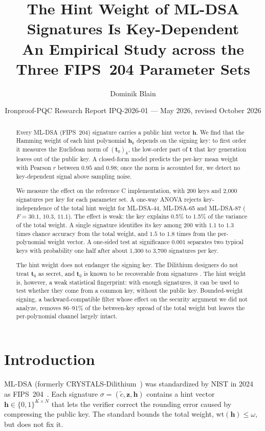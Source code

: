 \documentclass{article}
\title{\textbf{The Hint Weight of ML-DSA Signatures Is Key-Dependent}\\[4pt]
\large An Empirical Study across the Three FIPS~204 Parameter Sets}
\author[1]{Dominik Blain}
\affil[1]{Ironproof \quad \texttt{dominik@ironproof.ai}}
\date{Ironproof-PQC Research Report IPQ-2026-01 \quad --- \quad May 2026, revised October 2026}
\newcommand{\hint}{\mathbf{h}}
\newcommand{\tzero}{\mathbf{t}_0}
\newcommand{\boldz}{\mathbf{z}}
\newcommand{\wt}[1]{\mathrm{wt}(#1)}
\begin{document}
\maketitle

\begin{abstract}
Every ML-DSA (FIPS~204) signature carries a public hint vector $\hint$.
We find that the Hamming weight of each hint polynomial $\hint_k$ depends on
the signing key: to first order it measures the Euclidean norm of
$(\tzero)_k$, the low-order part of $\mathbf{t}$ that key generation leaves out
of the public key.  A closed-form model predicts the per-key mean weight with
Pearson $r$ between $0.95$ and $0.98$; once the norm is accounted for, we
detect no key-dependent signal above sampling noise.

We measure the effect on the reference C implementation, with 200 keys and
2,000 signatures per key for each parameter set.  A one-way ANOVA rejects
key-independence of the total hint weight for ML-DSA-44, ML-DSA-65 and
ML-DSA-87 ($F = 30.1$, $10.3$, $11.1$).  The effect is weak: the key explains
0.5\% to 1.5\% of the variance of the total weight.  A single signature
identifies its key among 200 with $1.1$ to $1.3$ times chance accuracy from
the total weight, and $1.5$ to $1.8$ times from the per-polynomial weight
vector.  A one-sided test at significance $0.001$ separates two typical keys with
probability one half after about 1,300 to 3,700 signatures per key.

The hint weight does not endanger the signing key.  The Dilithium designers do not treat
$\tzero$ as secret, and $\tzero$ is known to be recoverable from signatures
\cite{azevedo2024uncompressing}.  The hint weight is, however, a weak
statistical fingerprint: with enough signatures, it can be used to test whether
they come from a common key, without the public key.  Bounded-weight signing, a backward-compatible filter
whose effect on the security argument we did not analyze, removes 86--91\% of
the between-key spread of the total weight but leaves the per-polynomial
channel largely intact.
\end{abstract}

\section{Introduction}
\label{sec:intro}

ML-DSA (formerly CRYSTALS-Dilithium~\cite{ducas2018crystals}) was standardized
by NIST in 2024 as FIPS~204~\cite{nist2024fips204}.  Each signature
$\sigma = (\tilde{c}, \boldz, \hint)$ contains a hint vector
$\hint \in \{0,1\}^{K \times N}$ that lets the verifier correct the rounding
error caused by compressing the public key.  The standard bounds the total
weight, $\wt{\hint} \le \omega$, but does not fix it.
\end{document}
